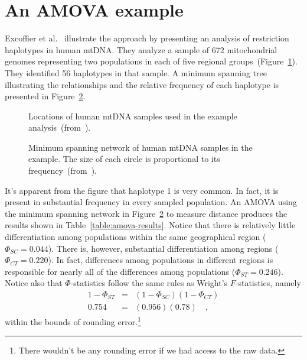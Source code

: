 \documentclass[12pt]{article}
\begin{document}
\section*{An AMOVA example}

Excoffier et al.~\cite{Excoffier-etal92} illustrate the approach by
presenting an analysis of restriction haplotypes in human mtDNA. They
analyze a sample of 672 mitochondrial genomes representing two
populations in each of five regional
groups~(Figure~\ref{fig:amova-sample-locations}). They identified 56
haplotypes in that sample. A minimum spanning tree illustrating the
relationships and the relative frequency of each haplotype is
presented in Figure~\ref{fig:amova-haplotypes}.

\begin{figure}
\begin{center}
\end{center}
\caption{Locations of human mtDNA samples used in the example
  analysis~(from~\cite{Excoffier-etal92}).}\label{fig:amova-sample-locations}
\end{figure}

\begin{figure}
\begin{center}
\end{center}
\caption{Minimum spanning network of human mtDNA samples in the
  example. The size of each circle is proportional to its
  frequency~(from~\cite{Excoffier-etal92}).}\label{fig:amova-haplotypes}
\end{figure}

It's apparent from the figure that haplotype 1 is very common. In
fact, it is present in substantial frequency in every sampled
population. An AMOVA using the minimum spanning network in
Figure~\ref{fig:amova-haplotypes} to measure distance produces the
results shown in Table~\ref{table:amova-results}. Notice that there is
relatively little differentiation among populations within the same
geographical region ($\Phi_{SC} = 0.044$). There is, however,
substantial differentiation among regions ($\Phi_{CT} = 0.220$). In
fact, differences among populations in different regions is
responsible for nearly all of the differences among populations
($\Phi_{ST} = 0.246$). Notice also that $\Phi$-statistics follow the
same rules as Wright's $F$-statistics, namely
\begin{eqnarray*}
1 - \Phi_{ST} &=& (1 - \Phi_{SC})(1 - \Phi_{CT}) \\
0.754 &=& (0.956)(0.78) \quad ,
\end{eqnarray*}
within the bounds of rounding error.\footnote{There wouldn't be any
  rounding error if we had access to the raw data.}
\end{document}
